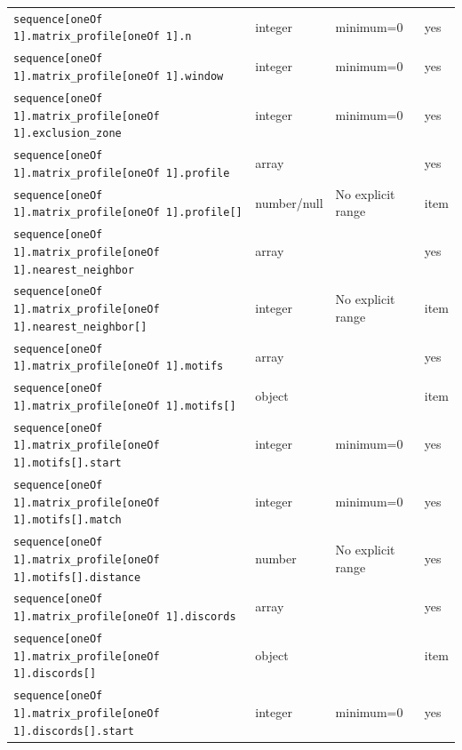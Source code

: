 \begin{longtable}{@{}p{}p{}p{}p{}@{}}
\texttt{sequence[oneOf 1].\allowbreak{}matrix\_\allowbreak{}profile[oneOf 1].\allowbreak{}n} & integer & minimum=0 & yes\\
\texttt{sequence[oneOf 1].\allowbreak{}matrix\_\allowbreak{}profile[oneOf 1].\allowbreak{}window} & integer & minimum=0 & yes\\
\texttt{sequence[oneOf 1].\allowbreak{}matrix\_\allowbreak{}profile[oneOf 1].\allowbreak{}exclusion\_\allowbreak{}zone} & integer & minimum=0 & yes\\
\texttt{sequence[oneOf 1].\allowbreak{}matrix\_\allowbreak{}profile[oneOf 1].\allowbreak{}profile} & array &  & yes\\
\texttt{sequence[oneOf 1].\allowbreak{}matrix\_\allowbreak{}profile[oneOf 1].\allowbreak{}profile[]} & number/null & No explicit range & item\\
\texttt{sequence[oneOf 1].\allowbreak{}matrix\_\allowbreak{}profile[oneOf 1].\allowbreak{}nearest\_\allowbreak{}neighbor} & array &  & yes\\
\texttt{sequence[oneOf 1].\allowbreak{}matrix\_\allowbreak{}profile[oneOf 1].\allowbreak{}nearest\_\allowbreak{}neighbor[]} & integer & No explicit range & item\\
\texttt{sequence[oneOf 1].\allowbreak{}matrix\_\allowbreak{}profile[oneOf 1].\allowbreak{}motifs} & array &  & yes\\
\texttt{sequence[oneOf 1].\allowbreak{}matrix\_\allowbreak{}profile[oneOf 1].\allowbreak{}motifs[]} & object &  & item\\
\texttt{sequence[oneOf 1].\allowbreak{}matrix\_\allowbreak{}profile[oneOf 1].\allowbreak{}motifs[].\allowbreak{}start} & integer & minimum=0 & yes\\
\texttt{sequence[oneOf 1].\allowbreak{}matrix\_\allowbreak{}profile[oneOf 1].\allowbreak{}motifs[].\allowbreak{}match} & integer & minimum=0 & yes\\
\texttt{sequence[oneOf 1].\allowbreak{}matrix\_\allowbreak{}profile[oneOf 1].\allowbreak{}motifs[].\allowbreak{}distance} & number & No explicit range & yes\\
\texttt{sequence[oneOf 1].\allowbreak{}matrix\_\allowbreak{}profile[oneOf 1].\allowbreak{}discords} & array &  & yes\\
\texttt{sequence[oneOf 1].\allowbreak{}matrix\_\allowbreak{}profile[oneOf 1].\allowbreak{}discords[]} & object &  & item\\
\texttt{sequence[oneOf 1].\allowbreak{}matrix\_\allowbreak{}profile[oneOf 1].\allowbreak{}discords[].\allowbreak{}start} & integer & minimum=0 & yes\\

\end{longtable}
